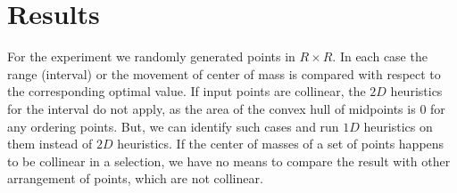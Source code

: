 \documentclass[11pt]{article} %
\begin{document}
\section{Results}
 For the experiment we randomly generated points in $R \times R$. In each case
 the range (interval) or the movement of center of mass  is compared with
 respect to the corresponding optimal value. If input points are collinear, the
 $2D$ heuristics for the interval do not apply, as the area of the convex hull of
 midpoints is $0$ for any ordering points. But, we can identify such cases and
 run $1D$ heuristics on them instead of $2D$ heuristics.  If the center of
 masses of a set of points happens to be collinear in a selection, we have no
 means to compare the result with other arrangement of points, which are not
 collinear.\\
\end{document}
